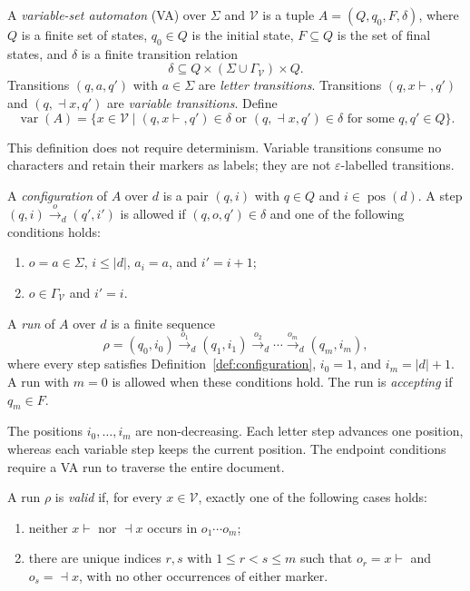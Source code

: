 \begin{definition}[VA]\label{def:va}
A \emph{variable-set automaton} (VA) over $\Sigma$ and $\mathcal V$ is
a tuple $A=(Q,q_0,F,\delta)$, where $Q$ is a finite set of states,
$q_0\in Q$ is the initial state, $F\subseteq Q$ is the set of final states,
and $\delta$ is a finite transition relation
\[
  \delta\subseteq Q\times(\Sigma\cup\Gamma_{\mathcal V})\times Q.
\]
Transitions $(q,a,q')$ with $a\in\Sigma$ are \emph{letter transitions}.
Transitions $(q,x\vdash,q')$ and $(q,\dashv x,q')$ are
\emph{variable transitions}. Define
\[
  \operatorname{var}(A)
  =\{x\in\mathcal V\mid
       (q,x\vdash,q')\in\delta\text{ or }(q,\dashv x,q')\in\delta
       \text{ for some }q,q'\in Q\}.
\]
\end{definition}

This definition does not require determinism. Variable transitions consume
no characters and retain their markers as labels; they are not
$\varepsilon$-labelled transitions.

\begin{definition}\label{def:configuration}
A \emph{configuration} of $A$ over $d$ is a pair $(q,i)$ with
$q\in Q$ and $i\in\operatorname{pos}(d)$. A step
$(q,i)\xrightarrow{o}_d(q',i')$ is allowed if $(q,o,q')\in\delta$ and
one of the following conditions holds:
\begin{enumerate}
  \item $o=a\in\Sigma$, $i\leq |d|$, $a_i=a$, and $i'=i+1$;
  \item $o\in\Gamma_{\mathcal V}$ and $i'=i$.
\end{enumerate}
\end{definition}

\begin{definition}\label{def:va-run}
A \emph{run} of $A$ over $d$ is a finite sequence
\[
  \rho=(q_0,i_0)\xrightarrow{o_1}_d(q_1,i_1)
       \xrightarrow{o_2}_d\cdots
       \xrightarrow{o_m}_d(q_m,i_m),
\]
where every step satisfies Definition~\ref{def:configuration},
$i_0=1$, and $i_m=|d|+1$. A run with $m=0$ is allowed when these
conditions hold. The run is \emph{accepting} if $q_m\in F$.
\end{definition}

The positions $i_0,\ldots,i_m$ are non-decreasing. Each letter step
advances one position, whereas each variable step keeps the current
position. The endpoint conditions require a VA run to traverse the
entire document.

\begin{definition}\label{def:valid-run}
A run $\rho$ is \emph{valid} if, for every $x\in\mathcal V$, exactly
one of the following cases holds:
\begin{enumerate}
  \item neither $x\vdash$ nor $\dashv x$ occurs in $o_1\cdots o_m$;
  \item there are unique indices $r,s$ with $1\leq r<s\leq m$ such that
        $o_r=x\vdash$ and $o_s=\dashv x$, with no other occurrences
        of either marker.
\end{enumerate}
\end{definition}

